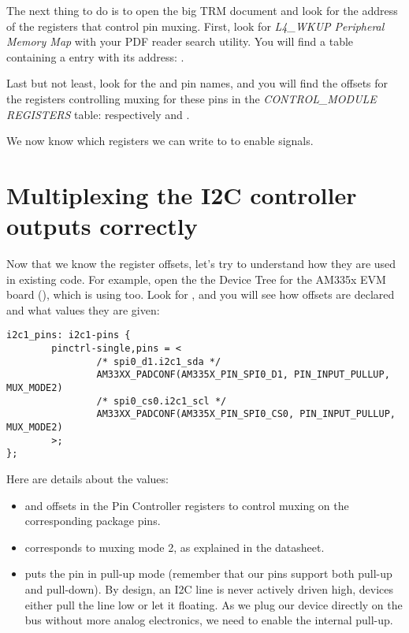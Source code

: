 The next thing to do is to open the big TRM document and look for the
address of the registers that control pin muxing. First, look for
{\em L4\_WKUP Peripheral Memory Map} with your PDF reader search
utility. You will find a table containing a
 entry with its address:
.

Last but not least, look for the  and 
pin names, and you will find the offsets for the registers controlling
muxing for these pins in the {\em CONTROL\_MODULE REGISTERS} table:
respectively  and .

We now know which registers we can write to to enable 
signals.

\section{Multiplexing the I2C controller outputs correctly}

Now that we know the register offsets, let's try to understand
how they are used in existing code. For example, open the
the Device Tree for the AM335x EVM board
(), which is using
 too. Look for , and you will see how
offsets are declared and what values they are given:

{\small
\begin{verbatim}
i2c1_pins: i2c1-pins {
        pinctrl-single,pins = <
                /* spi0_d1.i2c1_sda */
                AM33XX_PADCONF(AM335X_PIN_SPI0_D1, PIN_INPUT_PULLUP, MUX_MODE2)
                /* spi0_cs0.i2c1_scl */
                AM33XX_PADCONF(AM335X_PIN_SPI0_CS0, PIN_INPUT_PULLUP, MUX_MODE2)
        >;
};
\end{verbatim}
}

Here are details about the values:

\begin{itemize}
\item {} and  offsets
      in the Pin Controller registers to control muxing on the
      corresponding package pins.
\item {} corresponds to muxing mode 2, as explained in the
      datasheet.
\item {} puts the pin in pull-up mode (remember
      that our pins support both pull-up and pull-down). By design, an
      I2C line is never actively driven high, devices either pull the
      line low or let it floating. As we plug our device directly on the
      bus without more analog electronics, we need to enable the
      internal pull-up.
\end{itemize}

